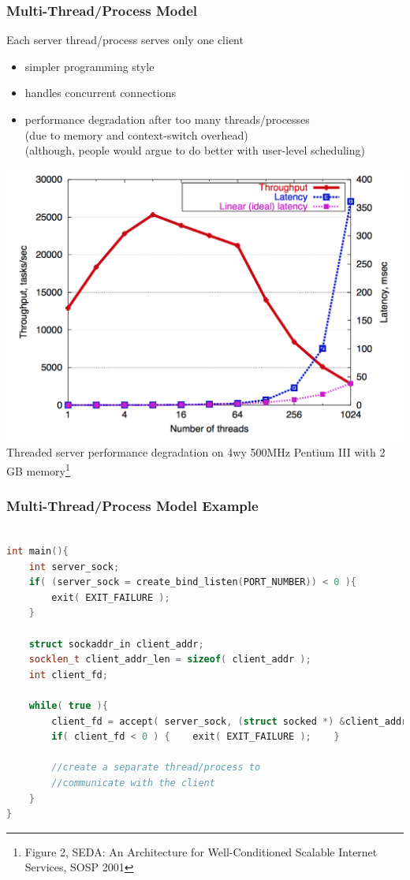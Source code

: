 \documentclass[aspectratio=43]{beamer}
\begin{document}
\begin{frame}[fragile]
  \frametitle{Multi-Thread/Process Model}
  Each server thread/process serves only one client\\
  \begin{itemize}
  \item simpler programming style
  \item handles concurrent connections
  \item performance degradation after too many threads/processes\\
  {\scriptsize (due to memory and context-switch overhead)}\\
  {\tiny (although, people would argue to do better with user-level scheduling)}
  \end{itemize}
  
  \begin{center}
   \includegraphics[scale=0.3]{server_mp_degrade.png}\\
   {\tiny Threaded server performance degradation on 4wy 500MHz Pentium III with 2 GB memory\footnote{\tiny Figure 2, SEDA: An Architecture for Well-Conditioned Scalable Internet Services, SOSP 2001}}
  \end{center}
\end{frame}
\begin{frame}[fragile]
  \frametitle{Multi-Thread/Process Model Example}
  \begin{lstlisting}[language=C++,basicstyle=\ttfamily\footnotesize,commentstyle=\color{commgreen},keywordstyle=\color{blue},breaklines=true]

int main(){
    int server_sock;
    if( (server_sock = create_bind_listen(PORT_NUMBER)) < 0 ){
        exit( EXIT_FAILURE );
    }
    
    struct sockaddr_in client_addr;
    socklen_t client_addr_len = sizeof( client_addr );
    int client_fd;
    
    while( true ){
        client_fd = accept( server_sock, (struct socked *) &client_addr, &client_addr_len );
        if( client_fd < 0 ) {    exit( EXIT_FAILURE );    }
        
        //create a separate thread/process to
        //communicate with the client
    }
}
\end{lstlisting}
\end{frame}
\end{document}
